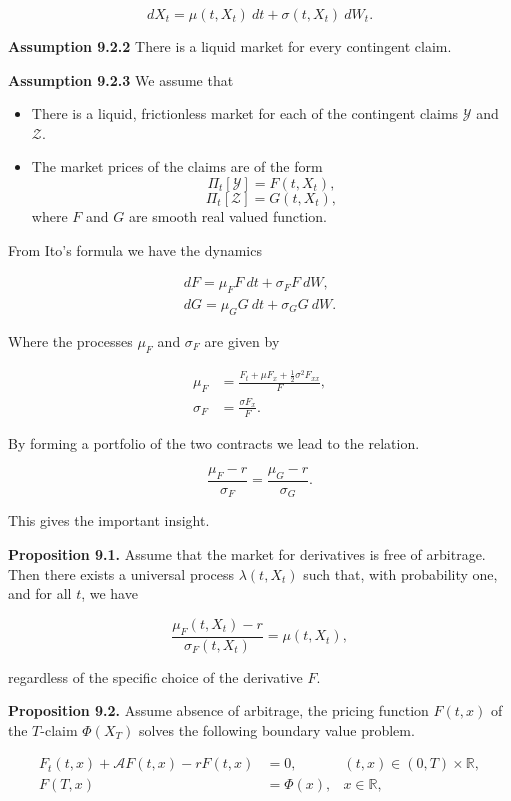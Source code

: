 \documentclass[
]{article}
\providecommand{\tightlist}{%
  \setlength{\itemsep}{0pt}\setlength{\parskip}{0pt}}
\begin{document}
\[
dX_t=\mu(t,X_t)\ dt+\sigma(t,X_t)\ dW_t.
\]

\textbf{Assumption 9.2.2} There is a liquid market for every contingent
claim.

\textbf{Assumption 9.2.3} We assume that

\begin{itemize}
\tightlist
\item
  There is a liquid, frictionless market for each of the contingent
  claims \(\mathcal{Y}\) and \(\mathcal{Z}\).
\item
  The market prices of the claims are of the form
  \[ \Pi_t[\mathcal{Y}] = F(t,X_t),\]
  \[ \Pi_t[\mathcal{Z}] = G(t,X_t),\] where \(F\) and \(G\) are smooth
  real valued function.
\end{itemize}

From Ito's formula we have the dynamics

\begin{align*}
dF=\mu_F F\ dt+\sigma_F F\ dW,\\
dG=\mu_G G\ dt+\sigma_G G\ dW.
\end{align*}

Where the processes \(\mu_F\) and \(\sigma_F\) are given by

\begin{align*}
\mu_F&=\frac{F_t+\mu F_x+\frac{1}{2}\sigma^2 F_{xx}}{F},\\
\sigma_F&=\frac{\sigma F_x}{F}.
\end{align*}

By forming a portfolio of the two contracts we lead to the relation.

\[
\frac{\mu_F-r}{\sigma_F}=\frac{\mu_G-r}{\sigma_G}.
\]

This gives the important insight.

\textbf{Proposition 9.1.} Assume that the market for derivatives is free
of arbitrage. Then there exists a universal process \(\lambda(t,X_t)\)
such that, with probability one, and for all \(t\), we have

\[
\frac{\mu_F(t,X_t)-r}{\sigma_F(t,X_t)}=\mu(t,X_t),
\]

regardless of the specific choice of the derivative \(F\).

\textbf{Proposition 9.2.} Assume absence of arbitrage, the pricing
function \(F(t,x)\) of the \(T\)-claim \(\Phi(X_T)\) solves the
following boundary value problem.

\begin{align*}
F_t(t,x)+\mathcal{A}F(t,x)-rF(t,x)&=0,\hspace{15pt}&(t,x)\in (0,T)\times \mathbb{R},\\
F(T,x)&=\Phi(x), &x\in\mathbb{R},
\end{align*}
\end{document}

